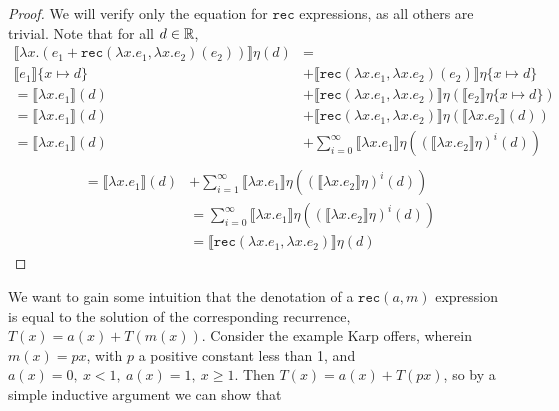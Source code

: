  \begin{proof}
 We will verify only the equation for $\texttt{rec}$ expressions, as all others are trivial.
 Note that for all $d \in \mathbb{R}$,
 \begin{align*}
 \llbracket \lambda x.(e_1 + \texttt{rec}(\lambda x.e_1, \lambda x.e_2)(e_2)) \rrbracket \eta(d)
 &= \\  
  \llbracket e_1 \rrbracket\{x\mapsto d\} &+ \llbracket \texttt{rec}(\lambda x.e_1, \lambda x.e_2)(e_2)\rrbracket\eta
 \{x\mapsto d\} \\
 = \llbracket \lambda x.e_1\rrbracket(d) &+ \llbracket\texttt{rec}(\lambda x.e_1, \lambda x.e_2)\rrbracket\eta
 (\llbracket e_2 \rrbracket\eta\{x \mapsto d\}) \\
 =  \llbracket \lambda x.e_1\rrbracket(d) &+ \llbracket\texttt{rec}(\lambda x.e_1, \lambda x.e_2)\rrbracket\eta
 (\llbracket \lambda x.e_2 \rrbracket(d)) \\
 = \llbracket \lambda x.e_1\rrbracket(d) &+ \sum_{i=0}^{\infty} \llbracket \lambda x.e_1\rrbracket\eta
 ((\llbracket \lambda x.e_2 \rrbracket\eta)^i (d)) \\
 \end{align*}
 \begin{align*}
 = \llbracket \lambda x.e_1\rrbracket(d) &+ \sum_{i=1}^{\infty} \llbracket \lambda x.e_1\rrbracket\eta
 ((\llbracket \lambda x.e_2 \rrbracket\eta)^i (d)) \\
&= \sum_{i=0}^\infty \llbracket \lambda x.e_1 \rrbracket\eta ((\llbracket \lambda x.e_2\rrbracket\eta)^i(d)) \\
&=  \llbracket \texttt{rec}(\lambda x.e_1, \lambda x.e_2) \rrbracket \eta (d)
\end{align*}
\end{proof}

We want to gain some intuition that the denotation of a $\texttt{rec}(a,m)$ expression is equal to the solution of the 
corresponding recurrence, $T(x) = a(x) + T(m(x))$.
Consider the example Karp offers, wherein $m(x) = px$, with $p$ a
positive constant less than 1, and $a(x) = 0, \ x < 1, \ a(x) = 1, \ x \geq 1$.
Then $T(x) = a(x) + T(px)$, so by a simple inductive argument we can show that 

